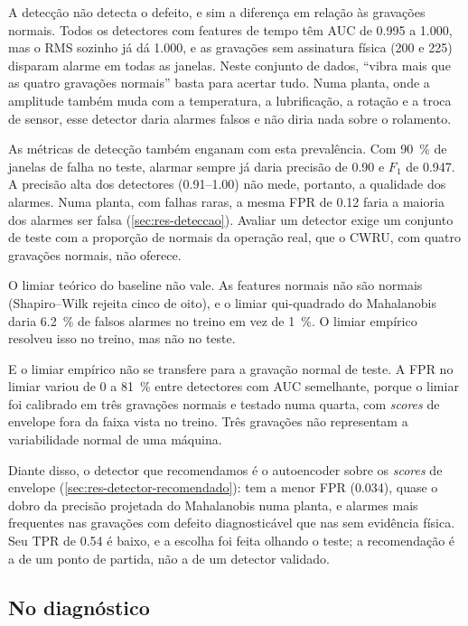A detecção não detecta o defeito, e sim a diferença em relação às gravações
normais. Todos os detectores com features de tempo têm AUC de
\num{0.995} a \num{1.000}, mas o RMS sozinho já dá \num{1.000}, e as gravações sem
assinatura física (200 e 225) disparam alarme em todas as janelas. Neste
conjunto de dados, ``vibra mais que as quatro gravações normais'' basta para
acertar tudo. Numa planta, onde a amplitude também muda com a temperatura, a
lubrificação, a rotação e a troca de sensor, esse detector daria alarmes falsos
e não diria nada sobre o rolamento.

As métricas de detecção também enganam com esta prevalência. Com
\SI{90}{\percent} de janelas de falha no teste, alarmar sempre já daria precisão
de \num{0.90} e $F_1$ de \num{0.947}. A precisão alta dos detectores
(\numrange{0.91}{1.00}) não mede, portanto, a qualidade dos alarmes. Numa planta,
com falhas raras, a mesma FPR de \num{0.12} faria a maioria dos alarmes ser falsa
(\autoref{sec:res-deteccao}). Avaliar um detector exige um conjunto de teste com a
proporção de normais da operação real, que o CWRU, com quatro gravações normais,
não oferece.

O limiar teórico do baseline não vale. As features normais não são normais
(Shapiro--Wilk rejeita cinco de oito), e o limiar qui-quadrado do Mahalanobis
daria \SI{6.2}{\percent} de falsos alarmes no treino em vez de \SI{1}{\percent}.
O limiar empírico resolveu isso no treino, mas não no teste.

E o limiar empírico não se transfere para a gravação normal de teste. A FPR no limiar variou de 0 a
\SI{81}{\percent} entre detectores com AUC semelhante, porque o limiar foi
calibrado em três gravações normais e testado numa quarta, com \emph{scores} de
envelope fora da faixa vista no treino. Três gravações não representam a
variabilidade normal de uma máquina.

Diante disso, o detector que recomendamos é o autoencoder sobre os \emph{scores}
de envelope (\autoref{sec:res-detector-recomendado}): tem a menor FPR
(\num{0.034}), quase o dobro da precisão projetada do Mahalanobis numa planta, e
alarmes mais frequentes nas gravações com defeito diagnosticável que nas sem
evidência física. Seu TPR de \num{0.54} é baixo, e a escolha foi feita olhando o
teste; a recomendação é a de um ponto de partida, não a de um detector
validado.

\subsection{No diagnóstico}
\label{sec:nao-funcionou-diagnostico}

